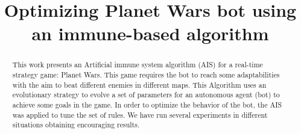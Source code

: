 \documentclass[conference]{IEEEtran}
\begin{document}
\title{\vspace{0.3cm}Optimizing Planet Wars bot using an immune-based algorithm}


\author{
\and
{}
\and
{}
}
\maketitle
{}
\setlength{\headsep}{0.5in}
\begin{abstract}
This work presents an Artificial immune system algorithm (AIS) for a real-time strategy game: Planet Wars. This game requires the bot to reach some adaptabilities with the aim to beat different enemies in different maps. This Algorithm uses an evolutionary strategy to evolve a set of parameters for an autonomous agent (bot) to achieve some goals in the game. In order to optimize the behavior of the bot, the AIS was applied to tune the set of rules. We have run several experiments in different situations obtaining encouraging results.
\end{abstract}
\end{document}
